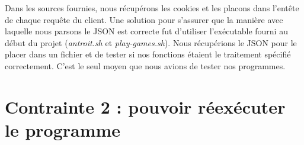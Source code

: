 \documentclass[12pt,a4paper]{report}
\begin{document}
Dans les sources fournies, nous récupérons les cookies et les placons dans
l'entête de chaque requête du client. Une solution pour s'assurer que la manière
avec laquelle nous parsons le JSON est correcte fut d'utiliser l'exécutable
fourni au début du projet (\emph{antroit.sh} et \emph{play-games.sh}). Nous
récupérions le JSON pour le placer dans un fichier et de tester si nos
fonctions étaient le traitement spécifié correctement. C'est le seul moyen que
nous avions de tester nos programmes.

\section{Contrainte 2 : pouvoir réexécuter le programme}
\end{document}
